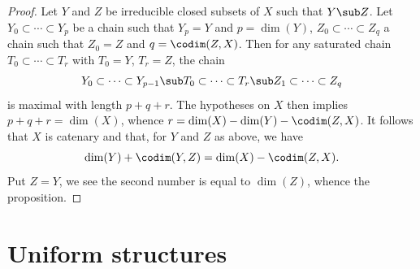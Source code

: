 \begin{proof}
Let $Y$ and $Z$ be irreducible closed subsets of $X$ such that $Y\sub Z$. Let $Y_0\subset\cdots\subset Y_p$ be a chain such that $Y_p=Y$ and $p=\dim(Y)$, $Z_0\subset\cdots\subset Z_q$ a chain such that $Z_0=Z$ and $q=\codim(Z,X)$. Then for any saturated chain $T_0\subset\cdots\subset T_r$ with $T_0=Y$, $T_r=Z$, the chain
\[Y_0\subset\cdots\subset Y_{p-1}\sub T_0\subset\cdots\subset T_r\sub Z_1\subset\cdots\subset Z_q\]
is maximal with length $p+q+r$. The hypotheses on $X$ then implies $p+q+r=\dim(X)$, whence $r=\dim(X)-\dim(Y)-\codim(Z,X)$. It follows that $X$ is catenary and that, for $Y$ and $Z$ as above, we have
\[\dim(Y)+\codim(Y,Z)=\dim(X)-\codim(Z,X).\]
Put $Z=Y$, we see the second number is equal to $\dim(Z)$, whence the proposition.
\end{proof}

\chapter{Uniform structures}
